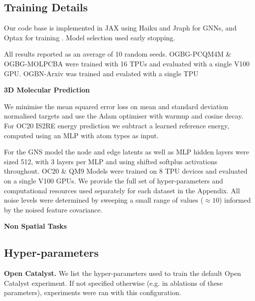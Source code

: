 \documentclass{article} \usepackage{iclr2022_conference,times}
\begin{document}
\subsection{Training Details}\label{mol-3d-training}

Our code base is implemented in JAX using Haiku and Jraph for GNNs, and Optax for training \citep{jax2018github, deepmind2020jax, jraph2020github, haiku2020github}. Model selection used early stopping. 

All results reported as an average of 10 random seeds. OGBG-PCQM4M \& OGBG-MOLPCBA were trained with 16 TPUs and evaluated with a single V100 GPU. OGBN-Arxiv was trained and evalated with a single TPU

\textbf{3D Molecular Prediction}

We minimise the mean squared error loss on mean and standard deviation normalised targets and use the Adam \citep{Kingma2015AdamAM} optimiser with warmup and cosine decay. For OC20 IS2RE energy prediction we subtract a learned reference energy, computed using an MLP with atom types as input.

For the GNS model the node and edge latents as well as MLP hidden layers were sized 512, with 3 layers per MLP and using shifted softplus activations throughout. OC20 \& QM9 Models were trained on 8 TPU devices and evaluated on a single V100 GPUs. We provide the full set of hyper-parameters and computational resources used separately for each dataset in the Appendix. All noise levels were determined by sweeping a small range of values ($\approx10$) informed by the noised feature covariance. 


\textbf{Non Spatial Tasks}



\subsection{Hyper-parameters}
\textbf{Open Catalyst.} We list the hyper-parameters used to train the default Open Catalyst experiment. If not specified otherwise (e.g. in ablations of these parameters), experiments were ran with this configuration.
\end{document}
